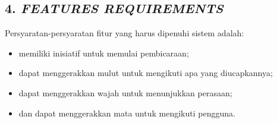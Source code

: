 \subsection*{\textcolor{subsectioncolor}{\textsf{4. \textit{FEATURES REQUIREMENTS}}}}

Persyaratan-persyaratan fitur yang harus dipenuhi sistem adalah:
\begin{itemize}
\item memiliki inisiatif untuk memulai pembicaraan;
\item dapat menggerakkan mulut untuk mengikuti apa yang diucapkannya;
\item dapat menggerakkan wajah untuk menunjukkan perasaan;
\item dan dapat menggerakkan mata untuk mengikuti pengguna.
\end{itemize}
